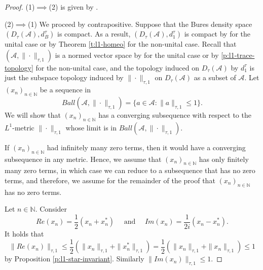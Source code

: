 \documentclass{amsart}
\theoremstyle{plain}
\theoremstyle{definition}
\theoremstyle{remark}
\numberwithin{equation}{section}
\newcommand{\A}{{\mathcal{A}}}
\newcommand{\N}{{\mathds{N}}}
\renewcommand{\leq}{\leqslant}
\begin{document}
\begin{proof}
    (1)$\implies$(2) is given by \cite[Proposition 3.3 and Theorem 3.5]{Aguilar25}.

    (2)$\implies$(1) We proceed by contrapositive. Suppose  that the Bures density space $(D_\tau(\A), d_B^\tau)$ is compact. As  a result,  $(D_\tau(\A), d_1^\tau)$ is compact by \cite[Corollary 2.8]{Farenick-Rahaman17} for the unital case or by Theorem \ref{t:l1-homeo} for the non-unital case. Recall that $(\A, \|\cdot\|_{\tau,1})$ is a normed vector space by \cite[Proposition 2.1]{Farenick-Rahaman17} for the unital case or by \ref{p:l1-trace-topology} for the non-unital case, and  the topology induced on $D_\tau(\A)$ by $ d_1^\tau$ is just the subspace topology induced by $\|\cdot\|_{\tau,1}$ on $D_\tau(\A)$   as a subset of $\A$.  Let $(x_n)_{n\in \N}$ be a sequence in 
    \[
    Ball(\A, \|\cdot\|_{\tau,1})=\{a \in \A: \|a\|_{\tau,1}\leq 1\}.
    \]
    We will show that $(x_n)_{n\in \N}$ has a converging subsequence with respect to the $L^1$-metric $\|\cdot\|_{\tau,1}$ whose limit is in $Ball(\A, \|\cdot\|_{\tau,1})$. 
    
    If $(x_n)_{n\in \N}$ had infinitely many zero terms, then it would have a converging subsequence in any metric. Hence, we assume that $(x_n)_{n\in \N}$ has only finitely many zero terms, in which case we can reduce to a subsequence that has no zero terms, and therefore, we assume for the remainder of the proof that $(x_n)_{n\in \N}$ has no zero terms.

    Let $n\in \N$. Consider
    \[
    Re(x_n)=\frac{1}{2}(x_n+x_n^*) \quad \text{ and } \quad Im(x_n)=\frac{1}{2i}(x_n-x_n^*).
    \]
   It holds that 
    \[
    \|Re(x_n)\|_{\tau,1}\leq\frac{1}{2}(\|x_n\|_{\tau,1}+\|x_n^*\|_{\tau,1})= \frac{1}{2}(\|x_n\|_{\tau,1}+\|x_n\|_{\tau,1})\leq 1
    \]
    by Proposition \ref{p:l1-star-invariant}. Similarly $\|Im(x_n)\|_{\tau,1}\leq 1$.


\end{proof}
\end{document}
